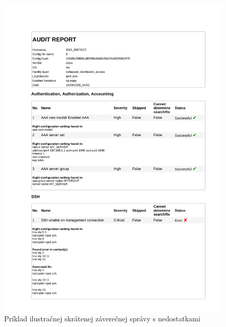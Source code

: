 \begin{figure}[H]
	\caption[Príklad ilustračnej skrátenej záverečnej správy s nedostatkami]{Príklad ilustračnej skrátenej záverečnej správy s nedostatkami}
	\begin{center}
		\includegraphics[scale=0.8]{obrazky/report_html_page_1.pdf}
	\end{center}
	
	\label{report_1}
\end{figure}
